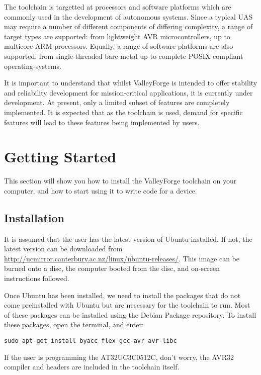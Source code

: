 \documentclass[a4paper, oneside, 11pt, titlepage, onecolumn, openright]{report}
\begin{document}
				The toolchain is targetted at processors and software platforms which are commonly used in the development of autonomous systems.  Since a typical UAS may require a number of different components of differing complexity, a range of target types are supported: from lightweight AVR microcontrollers, up to multicore ARM processors.  Equally, a range of software platforms are also supported, from single-threaded bare metal up to complete POSIX compliant operating-systems.
				
				It is important to understand that whilst ValleyForge is intended to offer stability and reliability development for mission-critical applications, it is currently under development.  At present, only a limited subset of features are completely implemented.  It is expected that as the toolchain is used, demand for specific features will lead to these features being implemented by users.
			
		\chapter{Getting Started}
			\label{c:Getting Started}

			This section will show you how to install the ValleyForge toolchain on your computer, and how to start using it to write code for a device.

			\section{Installation }
				\label{s:Getting Started:Installation}

				It is assumed that the user has the latest version of Ubuntu installed. If not, the latest version can be downloaded from \url{http://ucmirror.canterbury.ac.nz/linux/ubuntu-releases/}. This image can be burned onto a disc, the computer booted from the disc, and on-screen instructions followed.
			
Once Ubuntu has been installed, we need to install the packages that do not come preinstalled with Ubuntu but are necessary for the toolchain to run. Most of these packages can be installed using the Debian Package repository. To install these packages, open the terminal, and enter:
			
				\begin{lstlisting}
sudo apt-get install byacc flex gcc-avr avr-libc
				\end{lstlisting}

If the user is programming the AT32UC3C0512C, don't worry, the AVR32 compiler and headers are included in the toolchain itself.
\end{document}
